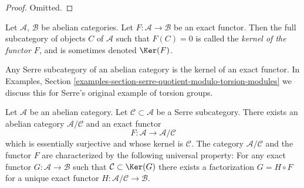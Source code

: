 \begin{proof}
Omitted.
\end{proof}

\begin{definition}
\label{definition-kernel-category}
Let $\mathcal{A}$, $\mathcal{B}$ be abelian categories.
Let $F : \mathcal{A} \to \mathcal{B}$ be an exact functor.
Then the full subcategory of objects $C$ of $\mathcal{A}$
such that $F(C) = 0$ is called the {\it kernel of the functor $F$},
and is sometimes denoted $\Ker(F)$.
\end{definition}

\noindent
Any Serre subcategory of an abelian category is the kernel of
an exact functor. In
Examples, Section \ref{examples-section-serre-quotient-modulo-torsion-modules}
we discuss this for Serre's original example of torsion groups.

\begin{lemma}
\label{lemma-serre-subcategory-is-kernel}
Let $\mathcal{A}$ be an abelian category.
Let $\mathcal{C} \subset \mathcal{A}$ be a Serre subcategory.
There exists an abelian category $\mathcal{A}/\mathcal{C}$
and an exact functor
$$
F : \mathcal{A} \longrightarrow \mathcal{A}/\mathcal{C}
$$
which is essentially surjective and whose kernel is $\mathcal{C}$.
The category $\mathcal{A}/\mathcal{C}$ and the functor $F$ are
characterized by the following universal property: For any exact
functor $G : \mathcal{A} \to \mathcal{B}$ such that
$\mathcal{C} \subset \Ker(G)$ there exists a factorization
$G = H \circ F$ for a unique exact functor
$H : \mathcal{A}/\mathcal{C} \to \mathcal{B}$.
\end{lemma}

